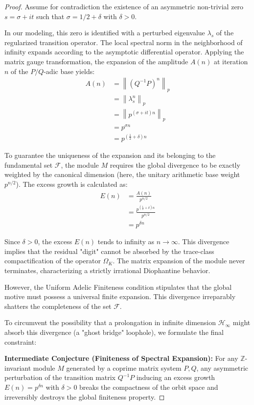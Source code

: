 \documentclass[
]{article}
\begin{document}
\begin{proof}
Assume for contradiction the existence of an asymmetric non-trivial zero $s = \sigma + it$ such that $\sigma = 1/2 + \delta$ with $\delta > 0$.

In our modeling, this zero is identified with a perturbed eigenvalue $\lambda_s$ of the regularized transition operator. The local spectral norm in the neighborhood of infinity expands according to the asymptotic differential operator. Applying the matrix gauge transformation, the expansion of the amplitude $A(n)$ at iteration $n$ of the $P/Q$-adic base yields:
\begin{align*}
    A(n) &= \left\| (Q^{-1}P)^n \right\|_p \\
    &= \left\| \lambda_s^n \right\|_p \\
    &= \left\| p^{(\sigma + it)n} \right\|_p \\
    &= p^{\sigma n} \\
    &= p^{(\frac{1}{2} + \delta)n}
\end{align*}

To guarantee the uniqueness of the expansion and its belonging to the fundamental set $\mathcal{F}$, the module $M$ requires the global divergence to be exactly weighted by the canonical dimension (here, the unitary arithmetic base weight $p^{n/2}$). The excess growth is calculated as:
\begin{align*}
    E(n) &= \frac{A(n)}{p^{n/2}} \\
    &= \frac{p^{(\frac{1}{2} + \delta)n}}{p^{n/2}} \\
    &= p^{\delta n}
\end{align*}

Since $\delta > 0$, the excess $E(n)$ tends to infinity as $n \to \infty$. This divergence implies that the residual "digit" cannot be absorbed by the trace-class compactification of the operator $\Omega_K$. The matrix expansion of the module never terminates, characterizing a strictly irrational Diophantine behavior.

However, the Uniform Adelic Finiteness condition stipulates that the global motive must possess a universal finite expansion. This divergence irreparably shatters the completeness of the set $\mathcal{F}$.

To circumvent the possibility that a prolongation in infinite dimension $\mathcal{H}_{\infty}$ might absorb this divergence (a "ghost bridge" loophole), we formulate the final constraint:

\textbf{Intermediate Conjecture (Finiteness of Spectral Expansion):} For any $\mathbb{Z}$-invariant module $M$ generated by a coprime matrix system $P, Q$, any asymmetric perturbation of the transition matrix $Q^{-1}P$ inducing an excess growth $E(n) = p^{\delta n}$ with $\delta > 0$ breaks the compactness of the orbit space and irreversibly destroys the global finiteness property.


\end{proof}
\end{document}
